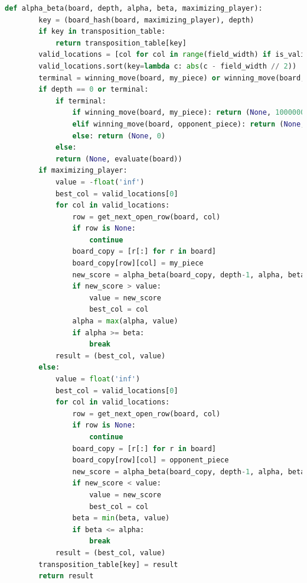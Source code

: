 \begin{lstlisting}[language=Python]
	def alpha_beta(board, depth, alpha, beta, maximizing_player):
		key = (board_hash(board, maximizing_player), depth)
		if key in transposition_table:
			return transposition_table[key]
		valid_locations = [col for col in range(field_width) if is_valid_location(board, col)]
		valid_locations.sort(key=lambda c: abs(c - field_width // 2))
		terminal = winning_move(board, my_piece) or winning_move(board, opponent_piece) or len(valid_locations) == 0
		if depth == 0 or terminal:
			if terminal:
				if winning_move(board, my_piece): return (None, 1000000)
				elif winning_move(board, opponent_piece): return (None, -1000000)
				else: return (None, 0)
			else:
			return (None, evaluate(board))
		if maximizing_player:
			value = -float('inf')
			best_col = valid_locations[0]
			for col in valid_locations:
				row = get_next_open_row(board, col)
				if row is None:
					continue
				board_copy = [r[:] for r in board]
				board_copy[row][col] = my_piece
				new_score = alpha_beta(board_copy, depth-1, alpha, beta, False)[1]
				if new_score > value:
					value = new_score
					best_col = col
				alpha = max(alpha, value)
				if alpha >= beta:
					break
			result = (best_col, value)
		else:
			value = float('inf')
			best_col = valid_locations[0]
			for col in valid_locations:
				row = get_next_open_row(board, col)
				if row is None:
					continue
				board_copy = [r[:] for r in board]
				board_copy[row][col] = opponent_piece
				new_score = alpha_beta(board_copy, depth-1, alpha, beta, True)[1]
				if new_score < value:
					value = new_score
					best_col = col
				beta = min(beta, value)
				if beta <= alpha:
					break
			result = (best_col, value)
		transposition_table[key] = result
		return result
\end{lstlisting}

